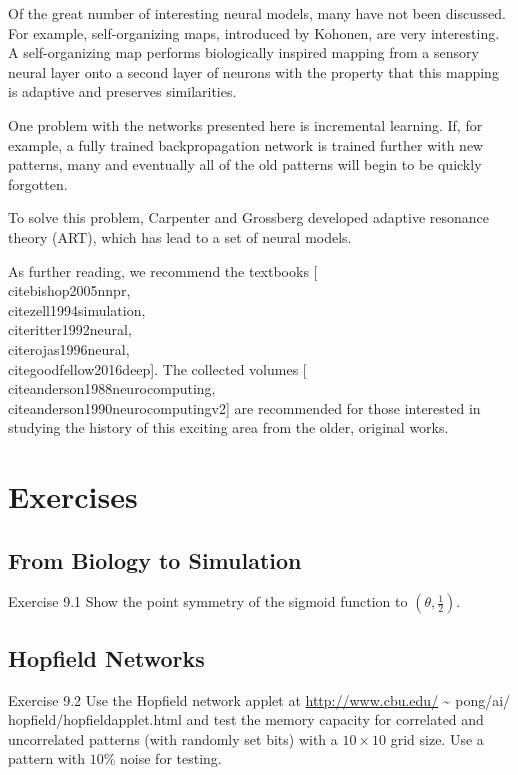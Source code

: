 \documentclass[10pt]{book}
\begin{document}
Of the great number of interesting neural models, many have not been discussed. For example, self-organizing maps, introduced by Kohonen, are very interesting. A self-organizing map performs biologically inspired mapping from a sensory neural layer onto a second layer of neurons with the property that this mapping is adaptive and preserves similarities.

One problem with the networks presented here is incremental learning. If, for example, a fully trained backpropagation network is trained further with new patterns, many and eventually all of the old patterns will begin to be quickly forgotten.

To solve this problem, Carpenter and Grossberg developed adaptive resonance theory (ART), which has lead to a set of neural models.


As further reading, we recommend the textbooks [\\cite{bishop2005nnpr}, \\cite{zell1994simulation}, \\cite{ritter1992neural}, \\cite{rojas1996neural}, \\cite{goodfellow2016deep}]. The collected volumes [\\cite{anderson1988neurocomputing}, \\cite{anderson1990neurocomputingv2}] are recommended for those interested in studying the history of this exciting area from the older, original works.

\section{Exercises}
\subsection{From Biology to Simulation}
Exercise 9.1 Show the point symmetry of the sigmoid function to $\left(\theta, \frac{1}{2}\right)$.

\subsection{Hopfield Networks}
Exercise 9.2 Use the Hopfield network applet at \href{http://www.cbu.edu/}{http://www.cbu.edu/} \~{} pong/ai/ hopfield/hopfieldapplet.html and test the memory capacity for correlated and uncorrelated patterns (with randomly set bits) with a $10 \times 10$ grid size. Use a pattern with $10 \%$ noise for testing.
\end{document}
